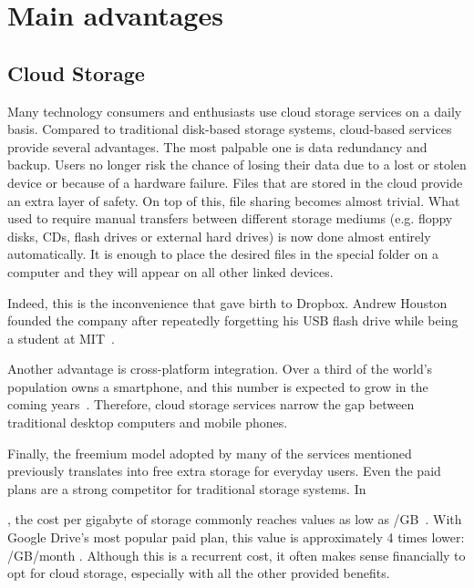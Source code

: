 \section{Main advantages}

\subsection{Cloud Storage}

Many technology consumers and enthusiasts use cloud storage services on a daily basis. Compared to traditional disk-based storage systems, cloud-based services provide several advantages. The most palpable one is data redundancy and backup. Users no longer risk the chance of losing their data due to a lost or stolen device or because of a hardware failure. Files that are stored in the cloud provide an extra layer of safety. On top of this, file sharing becomes almost trivial. What used to require manual transfers between different storage mediums (e.g. floppy disks, CDs, flash drives or external hard drives) is now done almost entirely automatically. It is enough to place the desired files in the special folder on a computer and they will appear on all other linked devices.

Indeed, this is the inconvenience that gave birth to Dropbox. Andrew Houston founded the company after repeatedly forgetting his USB flash drive while being a student at MIT~\cite{how_the_habit_of_forgetting}.

Another advantage is cross-platform integration. Over a third of the world's population owns a smartphone, and this number is expected to grow in the coming years~\cite{smartphone_ownership_usage_and_penetration_by_country}. Therefore, cloud storage services narrow the gap between traditional desktop computers and mobile phones.

Finally, the freemium model adopted by many of the services mentioned previously translates into free extra storage for everyday users. Even the paid plans are a strong competitor for traditional storage systems. In \date{2018}, the cost per gigabyte of storage commonly reaches values as low as \mbox{\slash GB}~\cite{hard_drive_cost_per_gigabyte}. With Google Drive's most popular paid plan, this value is approximately 4 times lower: \mbox{\slash GB\slash month} \cite{google_drive_pricing}. Although this is a recurrent cost, it often makes sense financially to opt for cloud storage, especially with all the other provided benefits.


